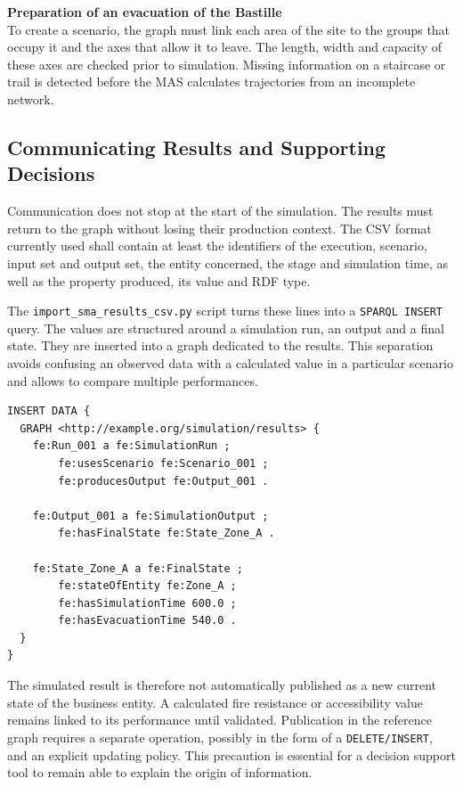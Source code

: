 \documentclass{article}
\begin{document}
\begin{filrouge}
\textbf{Preparation of an evacuation of the Bastille} \\
To create a scenario, the graph must link each area of the site to the groups that occupy it and the axes that allow it to leave. The length, width and capacity of these axes are checked prior to simulation. Missing information on a staircase or trail is detected before the MAS calculates trajectories from an incomplete network.
\end{filrouge}

\subsection{Communicating Results and Supporting Decisions}

Communication does not stop at the start of the simulation. The results must return to the graph without losing their production context. The CSV format currently used shall contain at least the identifiers of the execution, scenario, input set and output set, the entity concerned, the stage and simulation time, as well as the property produced, its value and RDF type.

The \texttt{import\_sma\_results\_csv.py} script turns these lines into a \texttt{SPARQL INSERT} query. The values are structured around a simulation run, an output and a final state. They are inserted into a graph dedicated to the results. This separation avoids confusing an observed data with a calculated value in a particular scenario and allows to compare multiple performances.

\begin{lstlisting}[language=SPARQL,caption={Insertion of a simulation result}]
INSERT DATA {
  GRAPH <http://example.org/simulation/results> {
    fe:Run_001 a fe:SimulationRun ;
        fe:usesScenario fe:Scenario_001 ;
        fe:producesOutput fe:Output_001 .

    fe:Output_001 a fe:SimulationOutput ;
        fe:hasFinalState fe:State_Zone_A .

    fe:State_Zone_A a fe:FinalState ;
        fe:stateOfEntity fe:Zone_A ;
        fe:hasSimulationTime 600.0 ;
        fe:hasEvacuationTime 540.0 .
  }
}
\end{lstlisting}

The simulated result is therefore not automatically published as a new current state of the business entity. A calculated fire resistance or accessibility value remains linked to its performance until validated. Publication in the reference graph requires a separate operation, possibly in the form of a \texttt{DELETE/INSERT}, and an explicit updating policy. This precaution is essential for a decision support tool to remain able to explain the origin of information.
\end{document}
